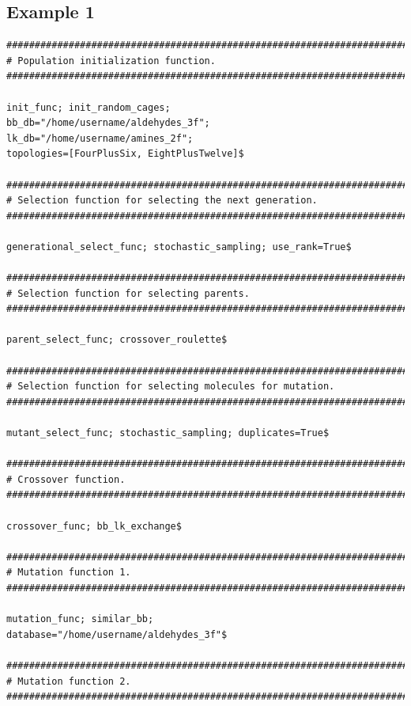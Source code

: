 \documentclass[12pt]{article}
\begin{document}
\subsection{Example 1}
\label{example 1}
\begin{Verbatim}
##################################################################################
# Population initialization function.
##################################################################################

init_func; init_random_cages;
bb_db="/home/username/aldehydes_3f";
lk_db="/home/username/amines_2f";
topologies=[FourPlusSix, EightPlusTwelve]$

##################################################################################
# Selection function for selecting the next generation.
##################################################################################

generational_select_func; stochastic_sampling; use_rank=True$

##################################################################################
# Selection function for selecting parents.
##################################################################################

parent_select_func; crossover_roulette$

##################################################################################
# Selection function for selecting molecules for mutation.
##################################################################################

mutant_select_func; stochastic_sampling; duplicates=True$

##################################################################################
# Crossover function.
##################################################################################

crossover_func; bb_lk_exchange$

##################################################################################
# Mutation function 1.
##################################################################################

mutation_func; similar_bb;
database="/home/username/aldehydes_3f"$

##################################################################################
# Mutation function 2.
##################################################################################


\end{Verbatim}
\end{document}
